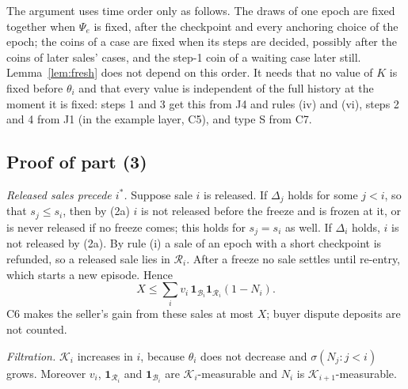\documentclass[10pt,a4paper]{article}
\newcommand{\ist}{i^{*}}
\newcommand{\cK}{\mathcal{K}}
\newcommand{\cR}{\mathcal{R}}
\newcommand{\cB}{\mathcal{B}}
\newcommand{\one}{\mathbf{1}}
\theoremstyle{plain}
\theoremstyle{remark}
\begin{document}
The argument uses time order only as follows. The draws of one epoch are fixed together when $\Psi_e$ is fixed, after the checkpoint and every anchoring choice of the epoch; the coins of a case are fixed when its steps are decided, possibly after the coins of later sales' cases, and the step-1 coin of a waiting case later still. Lemma~\ref{lem:fresh} does not depend on this order. It needs that no value of $K$ is fixed before $\theta_i$ and that every value is independent of the full history at the moment it is fixed: steps 1 and 3 get this from J4 and rules (iv) and (vi), steps 2 and 4 from J1 (in the example layer, C5), and type S from C7.

\subsection{Proof of part (3)}

\emph{Released sales precede $\ist$.} Suppose sale $i$ is released. If $\Delta_j$ holds for some $j<i$, so that $s_j\le s_i$, then by (2a) $i$ is not released before the freeze and is frozen at it, or is never released if no freeze comes; this holds for $s_j=s_i$ as well. If $\Delta_i$ holds, $i$ is not released by (2a). By rule (i) a sale of an epoch with a short checkpoint is refunded, so a released sale lies in $\cR_i$. After a freeze no sale settles until re-entry, which starts a new episode. Hence
\begin{equation}\label{eq:xbound}
X\le\sum_iv_i\,\one_{\cB_i}\one_{\cR_i}(1-N_i).
\end{equation}
C6 makes the seller's gain from these sales at most $X$; buyer dispute deposits are not counted.

\emph{Filtration.} $\cK_i$ increases in $i$, because $\theta_i$ does not decrease and $\sigma(N_j:j<i)$ grows. Moreover $v_i$, $\one_{\cR_i}$ and $\one_{\cB_i}$ are $\cK_i$-measurable and $N_i$ is $\cK_{i+1}$-measurable.
\end{document}
